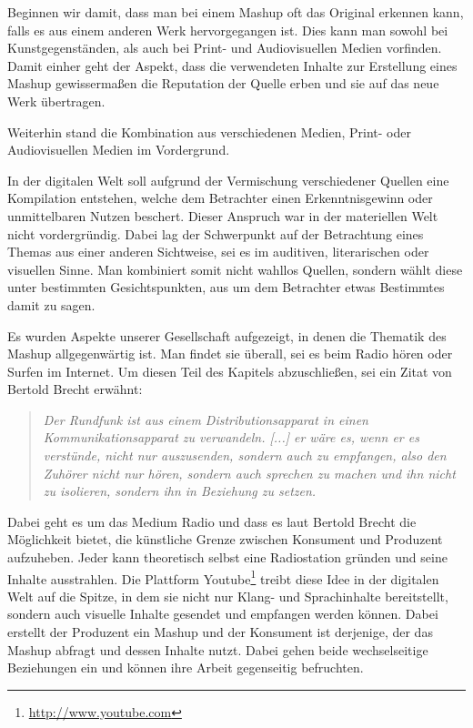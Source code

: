 \documentclass[11pt]{article}
\begin{document}
Beginnen wir damit, dass man bei einem Mashup oft das Original erkennen kann, falls es aus einem anderen Werk hervorgegangen ist. Dies kann man sowohl bei Kunstgegenständen, als auch bei Print- und Audiovisuellen Medien vorfinden. Damit einher geht der Aspekt, dass die verwendeten Inhalte zur Erstellung eines Mashup gewissermaßen die Reputation der Quelle erben und sie auf das neue Werk übertragen.

Weiterhin stand die Kombination aus verschiedenen Medien, Print- oder Audiovisuellen Medien im Vordergrund. 


\newpage 
\noindent
In der digitalen Welt soll aufgrund der Vermischung verschiedener Quellen eine Kompilation entstehen, welche dem Betrachter einen Erkenntnisgewinn oder unmittelbaren Nutzen beschert. Dieser Anspruch war in der materiellen Welt nicht vordergründig. Dabei lag der Schwerpunkt auf der Betrachtung eines Themas aus einer anderen Sichtweise, sei es im auditiven, literarischen oder visuellen Sinne. Man kombiniert somit nicht wahllos Quellen, sondern wählt diese unter bestimmten Gesichtspunkten, aus um dem Betrachter etwas Bestimmtes damit zu sagen.

Es wurden Aspekte unserer Gesellschaft aufgezeigt, in denen die Thematik des Mashup allgegenwärtig ist. Man findet sie überall, sei es beim Radio hören oder Surfen im Internet. Um diesen Teil des Kapitels abzuschließen, sei ein Zitat von Bertold Brecht erwähnt:

\begin{quote}
    \emph{Der Rundfunk ist aus einem Distributionsapparat in einen Kommunikationsapparat zu verwandeln. [...] er wäre es, wenn er es verstünde, nicht nur auszusenden, sondern auch zu empfangen, also den Zuhörer nicht nur hören, sondern auch sprechen zu machen und ihn nicht zu isolieren, sondern ihn in
Beziehung zu setzen.} \\ 
\cite[S. 260]{BRECHT-RADIO}
\end{quote}

\noindent 
Dabei geht es um das Medium Radio und dass es laut Bertold Brecht die Möglichkeit bietet, die künstliche Grenze zwischen Konsument und Produzent aufzuheben. Jeder kann theoretisch selbst eine Radiostation gründen und seine Inhalte ausstrahlen. Die Plattform Youtube\footnote{\url{http://www.youtube.com}} treibt diese Idee in der digitalen Welt auf die Spitze, in dem sie nicht nur Klang- und Sprachinhalte bereitstellt, sondern auch visuelle Inhalte gesendet und empfangen werden können. Dabei erstellt der Produzent ein Mashup und der Konsument ist derjenige, der das Mashup abfragt und dessen Inhalte nutzt. Dabei gehen beide wechselseitige Beziehungen ein und können ihre Arbeit gegenseitig befruchten.
\end{document}
